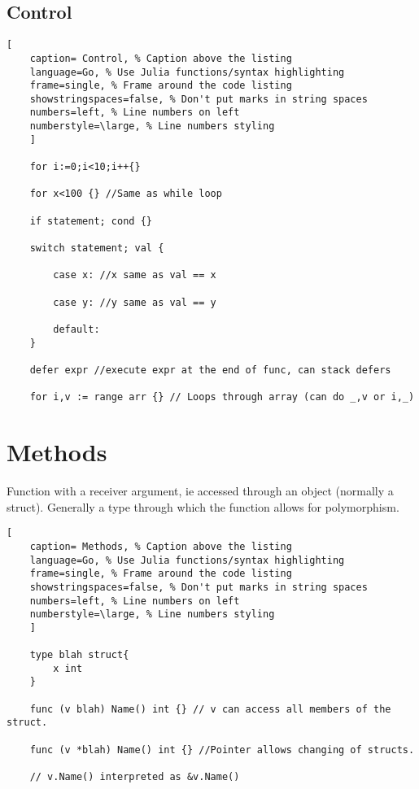 \documentclass[11pt]{scrartcl} %
\begin{document}
\subsection{Control}

\begin{lstlisting}[
	caption= Control, % Caption above the listing
	language=Go, % Use Julia functions/syntax highlighting
	frame=single, % Frame around the code listing
	showstringspaces=false, % Don't put marks in string spaces
	numbers=left, % Line numbers on left
	numberstyle=\large, % Line numbers styling
	]

	for i:=0;i<10;i++{}

	for x<100 {} //Same as while loop

	if statement; cond {}

	switch statement; val {

		case x: //x same as val == x

		case y: //y same as val == y

		default:
	}

	defer expr //execute expr at the end of func, can stack defers

	for i,v := range arr {} // Loops through array (can do _,v or i,_)

\end{lstlisting}

\section{Methods}

Function with a receiver argument, ie accessed through an object (normally a struct). 
Generally a type through which the function allows for polymorphism.

\begin{lstlisting}[
	caption= Methods, % Caption above the listing
	language=Go, % Use Julia functions/syntax highlighting
	frame=single, % Frame around the code listing
	showstringspaces=false, % Don't put marks in string spaces
	numbers=left, % Line numbers on left
	numberstyle=\large, % Line numbers styling
	]

	type blah struct{
		x int
	}

	func (v blah) Name() int {} // v can access all members of the struct.

	func (v *blah) Name() int {} //Pointer allows changing of structs.

	// v.Name() interpreted as &v.Name()
\end{lstlisting}
\end{document}
